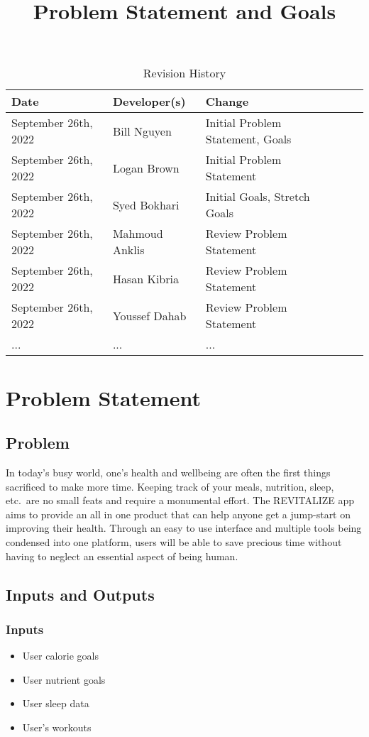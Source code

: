 \documentclass[12pt,letterpaper]{article}
\title{Problem Statement and Goals\\\progname}
\author{\authname}
\date{}
\begin{document}
\maketitle

\begin{table}[hp]
\caption{Revision History} \label{TblRevisionHistory}
\begin{tabularx}{\textwidth}{XlXlX}
\toprule
\textbf{Date} & \textbf{Developer(s)} & \textbf{Change}\\
\midrule
		September 26th, 2022 & Bill Nguyen  & Initial Problem Statement, Goals \\
		September 26th, 2022 & Logan Brown & Initial Problem Statement\\
		September 26th, 2022 & Syed Bokhari & Initial Goals, Stretch Goals\\
		September 26th, 2022 & Mahmoud Anklis  & Review Problem Statement\\
		September 26th, 2022 & Hasan Kibria  & Review Problem Statement\\
		September 26th, 2022 & Youssef Dahab& Review Problem Statement\\
... & ... & ...\\
\bottomrule
\end{tabularx}
\end{table}

\pagebreak
\section{Problem Statement}

\subsection{Problem}
\noindent
In today's busy world, one's health and wellbeing are often the first things sacrificed to make more time. Keeping track of your meals, nutrition, sleep, etc.\ are no small feats and require a monumental effort. The REVITALIZE app aims to provide an all in one product that can help anyone get a jump-start on improving their health. Through an easy to use interface and multiple tools being condensed into one platform, users will be able to save precious time without having to neglect an essential aspect of being human.

\subsection{Inputs and Outputs}
\subsubsection{Inputs}
\begin{itemize}
    \item User calorie goals
    \item User nutrient goals
    \item User sleep data
    \item User's workouts 
\end{itemize}
\end{document}
